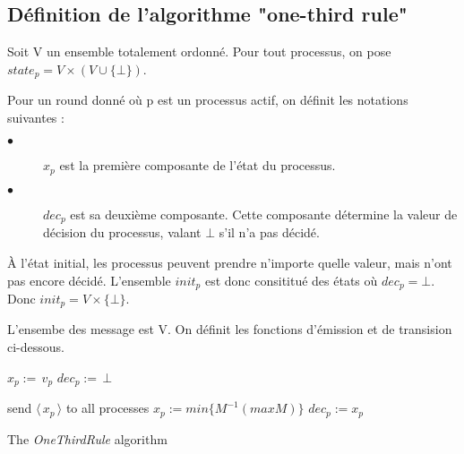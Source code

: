 \documentclass{article}
\begin{document}
\subsection{Définition de l'algorithme "one-third rule"}

Soit V un ensemble totalement ordonné. 
Pour tout processus, on pose $state_p = V \times (V \cup \{ \bot \})$.

Pour un round donné où p est un processus actif, on définit les notations suivantes :
\begin{description}

\item[$\bullet$] $x_p$ est la première composante de l'état du processus.
\item[$\bullet$] $dec_p$ est sa deuxième composante. Cette composante détermine la valeur de décision 
	du processus, valant $\bot$ s'il n'a pas décidé.

\end{description}

À l'état initial, les processus peuvent prendre n'importe quelle valeur, mais n'ont pas encore décidé.
	L'ensemble $init_p$ est donc consititué des états où $dec_p = \bot$.
	Donc $init_p = V \times \{ \bot \}$.

L'ensembe des message est V. 
	On définit les fonctions d'émission et de transision ci-dessous.

{\renewcommand{\baselinestretch}{1}
\begin{algorithm}[htb]
\scriptsize{
\begin{distribalgo}[1]
\BLANK {}
  \STATE $x_p :=\, v_p$ 
  \STATE $dec_p :=\, \bot$ 

\ENDINDENT \BLANK

    \STATE send $\langle\, x_p\, \rangle$ to all processes
  \ENDINDENT
  \BLANK
	  \STATE $x_p := min \{M^{-1} (max M)\}$ 
		  \STATE $dec_p := x_p$ 
        \ENDIF
      \ENDIF
  \ENDINDENT
\ENDINDENT \BLANK


\caption{The {\em OneThirdRule} algorithm} \label{algo:R}
\end{distribalgo}
}
\end{algorithm}
}
\end{document}
